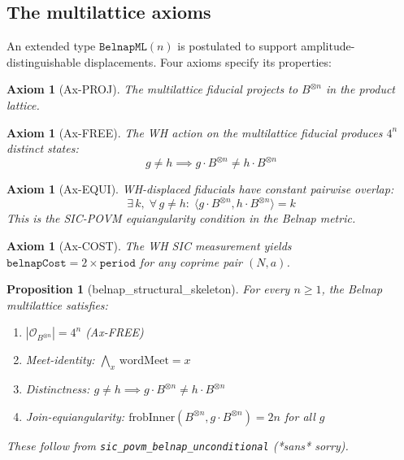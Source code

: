 \documentclass[12pt,a4paper]{article}
\newtheorem{proposition}[theorem]{Proposition}
\newtheorem{axiom_env}[theorem]{Axiom}
\begin{document}
\subsection{The multilattice axioms}
An extended type $\texttt{BelnapML}(n)$ is postulated to support amplitude-distinguishable
displacements. Four axioms specify its properties:
\begin{axiom_env}[Ax-PROJ]
The multilattice fiducial projects to $B^{\otimes n}$ in the product lattice.
\end{axiom_env}
\begin{axiom_env}[Ax-FREE]
The WH action on the multilattice fiducial produces $4^n$ distinct states:
\[
g \neq h \implies g \cdot B^{\otimes n} \neq h \cdot B^{\otimes n}
\]
\end{axiom_env}
\begin{axiom_env}[Ax-EQUI]
WH-displaced fiducials have constant pairwise overlap:
\[
\exists\, k,\; \forall\, g \neq h:\; \langle g \cdot B^{\otimes n}, h \cdot B^{\otimes n}\rangle = k
\]
This is the SIC-POVM equiangularity condition in the Belnap metric.
\end{axiom_env}
\begin{axiom_env}[Ax-COST]
The WH SIC measurement yields $\texttt{belnapCost} = 2 \times \texttt{period}$
for any coprime pair $(N, a)$.
\end{axiom_env}
\begin{proposition}[belnap\_structural\_skeleton]
\label{prop:skeleton}
For every $n \geq 1$, the Belnap multilattice satisfies:
\begin{enumerate}[label=(\arabic*)]
  \item $|\mathcal{O}_{B^{\otimes n}}| = 4^n$ \quad (Ax-FREE)
  \item Meet-identity: $\bigwedge_{x}\, \mathrm{wordMeet} = x$
  \item Distinctness: $g \neq h \implies g \cdot B^{\otimes n} \neq h \cdot B^{\otimes n}$
  \item Join-equiangularity: $\mathrm{frobInner}(B^{\otimes n}, g \cdot B^{\otimes n}) = 2n$ for all $g$
\end{enumerate}
These follow from \texttt{sic\_povm\_belnap\_unconditional} (*sans* sorry).
\end{proposition}
\end{document}
